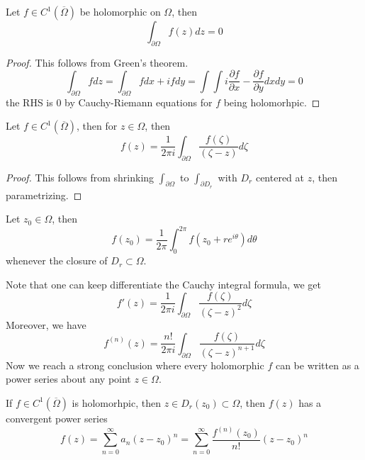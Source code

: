 \begin{thm}
    Let $f\in C^1(\overline{\Omega})$ be holomorphic on $\Omega$, then 
    \begin{equation*}
        \int_{\partial\Omega}f(z)dz=0
    \end{equation*}
\end{thm}
\begin{proof}
    This follows from Green's theorem.
    \begin{equation*}
        \int_{\partial\Omega}fdz=\int_{\partial\Omega} fdx+ifdy=\int\int i\frac{\partial f}{\partial x}-\frac{\partial f}{\partial y}dxdy=0
    \end{equation*}
    the RHS is 0 by Cauchy-Riemann equations for $f$ being holomorhpic.
\end{proof}
\begin{thm}
    Let $f\in C^1(\overline{\Omega})$, then for $z\in\Omega$, then 
    \begin{equation*}
        f(z)=\frac{1}{2\pi i}\int_{\partial\Omega}\frac{f(\zeta)}{(\zeta-z)}d\zeta
    \end{equation*}
\end{thm}
\begin{proof}
    This follows from shrinking $\int_{\partial\Omega}$ to $\int_{\partial D_r}$ with $D_r$ centered at $z$, then parametrizing.
\end{proof}
\begin{prop}
    Let $z_0\in\Omega$, then
    \begin{equation*}
        f(z_0)=\frac{1}{2\pi}\int_0^{2\pi}f(z_0+re^{i\theta})d\theta
    \end{equation*}
    whenever the closure of $D_r\subset\Omega$.
\end{prop}
Note that one can keep differentiate the Cauchy integral formula, we get 
\begin{equation*}
    f'(z)=\frac{1}{2\pi i}\int_{\partial\Omega}\frac{f(\zeta)}{(\zeta-z)^2}d\zeta
\end{equation*}
Moreover, we have
\begin{equation*}
    f^{(n)}(z)=\frac{n!}{2\pi i}\int_{\partial\Omega}\frac{f(\zeta)}{(\zeta-z)^{n+1}}d\zeta
\end{equation*}
Now we reach a strong conclusion where every holomorphic $f$ can be written as a power series about any point $z\in\Omega$.
\begin{prop}
    If $f\in C^1(\overline{\Omega})$ is holomorhpic, then $z\in D_r(z_0)\subset\Omega$, then $f(z)$ has a convergent power series 
    \begin{equation*}
        f(z)=\sum_{n=0}^\infty a_n(z-z_0)^n=\sum_{n=0}^\infty \frac{f^{(n)}(z_0)}{n!}(z-z_0)^n
    \end{equation*}
\end{prop}


